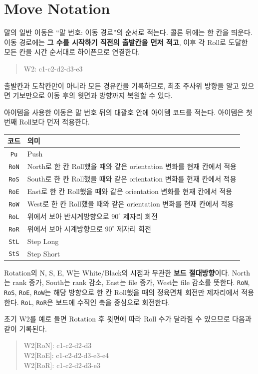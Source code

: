 \section{Move Notation}

말의 일반 이동은 ``말 번호: 이동 경로''의 순서로 적는다. 콜론 뒤에는 한 칸을 띄운다. 이동 경로에는 \textbf{그 수를 시작하기 직전의 출발칸을 먼저 적고}, 이후 각 Roll로 도달한 모든 칸을 시간 순서대로 하이픈으로 연결한다.
\begin{quote}\ttfamily W2: c1-c2-d2-d3-e3\end{quote}
출발칸과 도착칸만이 아니라 모든 경유칸을 기록하므로, 최초 주사위 방향을 알고 있으면 기보만으로 이동 후의 윗면과 방향까지 복원할 수 있다.

아이템을 사용한 이동은 말 번호 뒤의 대괄호 안에 아이템 코드를 적는다. 아이템은 첫 번째 Roll보다 먼저 적용한다.
\begin{center}\renewcommand{\arraystretch}{1.15}\begin{tabular}{@{}cL{0.66\textwidth}@{}}\toprule
코드 & 의미 \\\midrule
\texttt{Pu} & Push \\
\texttt{RoN} & North로 한 칸 Roll했을 때와 같은 orientation 변화를 현재 칸에서 적용 \\
\texttt{RoS} & South로 한 칸 Roll했을 때와 같은 orientation 변화를 현재 칸에서 적용 \\
\texttt{RoE} & East로 한 칸 Roll했을 때와 같은 orientation 변화를 현재 칸에서 적용 \\
\texttt{RoW} & West로 한 칸 Roll했을 때와 같은 orientation 변화를 현재 칸에서 적용 \\
\texttt{RoL} & 위에서 보아 반시계방향으로 $90^\circ$ 제자리 회전 \\
\texttt{RoR} & 위에서 보아 시계방향으로 $90^\circ$ 제자리 회전 \\
\texttt{StL} & Step Long \\
\texttt{StS} & Step Short \\\bottomrule
\end{tabular}\end{center}

Rotation의 N, S, E, W는 White/Black의 시점과 무관한 \textbf{보드 절대방향}이다. North는 rank 증가, South는 rank 감소, East는 file 증가, West는 file 감소를 뜻한다. \texttt{RoN}, \texttt{RoS}, \texttt{RoE}, \texttt{RoW}는 해당 방향으로 한 칸 Roll했을 때의 정육면체 회전만 제자리에서 적용한다. \texttt{RoL}, \texttt{RoR}은 보드에 수직인 축을 중심으로 회전한다.

초기 W2를 예로 들면 Rotation 후 윗면에 따라 Roll 수가 달라질 수 있으므로 다음과 같이 기록된다.
\begin{quote}\ttfamily
W2[RoN]: c1-c2-d2-d3\\
W2[RoE]: c1-c2-d2-d3-e3-e4\\
W2[RoR]: c1-c2-d2-d3-e3
\end{quote}

